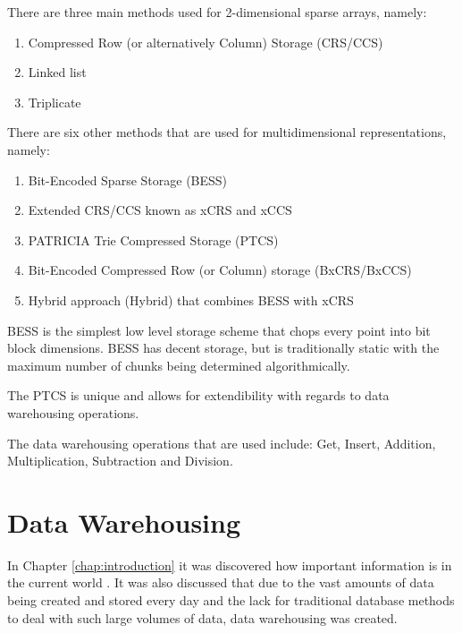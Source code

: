 There are three main methods used for 2-dimensional sparse arrays, namely: 
\begin{enumerate}
	\item Compressed Row (or alternatively Column) Storage (CRS/CCS)
	\item Linked list
	\item Triplicate 
\end{enumerate}	

There are six other methods that are used for multidimensional representations, namely: 
\begin{enumerate}
	\item Bit-Encoded Sparse Storage (BESS) 
	\item Extended CRS/CCS known as xCRS and xCCS
	\item PATRICIA Trie Compressed Storage (PTCS)
	\item Bit-Encoded Compressed Row (or Column) storage (BxCRS/BxCCS)
	\item Hybrid approach (Hybrid) that combines BESS with xCRS
\end{enumerate}

BESS is the simplest low level storage scheme that chops every point into bit block dimensions. BESS has decent storage, but is traditionally static with the maximum number of chunks being determined algorithmically.

The PTCS is unique and allows for extendibility with regards to data warehousing operations.

The data warehousing operations that are used include: Get, Insert, Addition, Multiplication, Subtraction and Division.

\section{Data Warehousing}
In Chapter \ref{chap:introduction} it was discovered how important information is in the current world \cite{golfarelli:2009:dwd}. It was also discussed that due to the vast amounts of data being created and stored every day and the lack for traditional database methods to deal with such large volumes of data, data warehousing was created.

